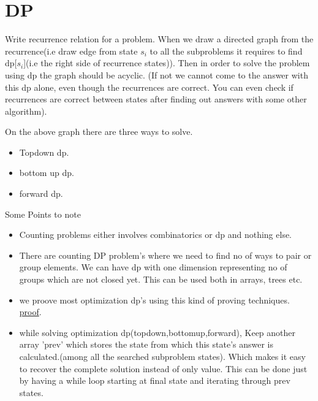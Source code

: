 \documentclass[../Notes.tex]{subfiles}
\begin{document}
\chapter{DP}

Write recurrence relation for a problem. When we draw a directed graph from the recurrence(i.e draw edge from state $s_i$ to all the subproblems it requires to find dp[$s_i$](i.e the right side of recurrence states)). Then in order to solve the problem using dp the graph should be acyclic. (If not we cannot come to the answer with this dp alone, even though the recurrences are correct. You can even check if recurrences are correct between states after finding out answers with some other algorithm).

On the above graph there are three ways to solve.
\begin{itemize}
	\item Topdown dp.
	\item bottom up dp.
	\item forward dp.
\end{itemize}	
Some Points to note
\begin{itemize}
	\item Counting problems either involves combinatorics or dp and nothing else.
	\item There are counting DP problem's where we need to find no of ways to pair or group elements. We can have dp with one dimension representing no of groups which are not closed yet. This can be used both in arrays, trees etc.  
	\item we proove most optimization dp's using this kind of proving techniques.
	\href{Material/dpproof.pdf}{proof}.\pagebreak
	\item while solving optimization dp(topdown,bottomup,forward), Keep another array 'prev' which stores the state from which this state's answer is calculated.(among all the searched subproblem states). Which makes it easy to recover the complete solution instead of only value. This can be done just by having a while loop starting at final state and iterating through prev states. 
\end{itemize}
\end{document}
